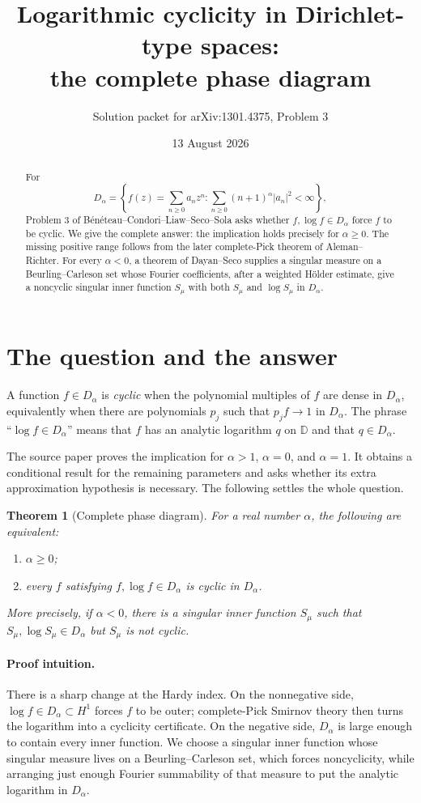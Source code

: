 \documentclass[11pt]{article}
\title{Logarithmic cyclicity in Dirichlet-type spaces:\\
the complete phase diagram}
\author{Solution packet for arXiv:1301.4375, Problem 3}
\date{13 August 2026}
\newtheorem{theorem}{Theorem}
\newcommand{\D}{\mathbb D}
\begin{document}
\maketitle

\begin{abstract}
For
\[
 D_\alpha=\left\{f(z)=\sum_{n\geq0}a_nz^n:
 \sum_{n\geq0}(n+1)^\alpha|a_n|^2<\infty\right\},
\]
Problem 3 of B\'en\'eteau--Condori--Liaw--Seco--Sola asks whether
$f,\log f\in D_\alpha$ force $f$ to be cyclic.  We give the complete
answer: the implication holds precisely for $\alpha\geq0$.  The missing
positive range follows from the later complete-Pick theorem of
Aleman--Richter.  For every $\alpha<0$, a theorem of Dayan--Seco supplies a
singular measure on a Beurling--Carleson set whose Fourier coefficients,
after a weighted H\"older estimate, give a noncyclic singular inner function
$S_\mu$ with both $S_\mu$ and $\log S_\mu$ in $D_\alpha$.
\end{abstract}

\section{The question and the answer}

A function $f\in D_\alpha$ is \emph{cyclic} when the polynomial multiples of
$f$ are dense in $D_\alpha$, equivalently when there are polynomials $p_j$
such that $p_jf\to1$ in $D_\alpha$.  The phrase ``$\log f\in D_\alpha$''
means that $f$ has an analytic logarithm $q$ on $\D$ and that
$q\in D_\alpha$.

The source paper \cite{BCLSS} proves the implication for $\alpha>1$,
$\alpha=0$, and $\alpha=1$.  It obtains a conditional result for the
remaining parameters and asks whether its extra approximation hypothesis is
necessary.  The following settles the whole question.

\begin{theorem}[Complete phase diagram]\label{thm:main}
For a real number $\alpha$, the following are equivalent:
\begin{enumerate}
\item $\alpha\geq0$;
\item every $f$ satisfying $f,\log f\in D_\alpha$ is cyclic in $D_\alpha$.
\end{enumerate}
More precisely, if $\alpha<0$, there is a singular inner function $S_\mu$
such that $S_\mu,\log S_\mu\in D_\alpha$ but $S_\mu$ is not cyclic.
\end{theorem}

\paragraph{Proof intuition.}
There is a sharp change at the Hardy index.  On the nonnegative side,
$\log f\in D_\alpha\subset H^1$ forces $f$ to be outer; complete-Pick
Smirnov theory then turns the logarithm into a cyclicity certificate.  On the
negative side, $D_\alpha$ is large enough to contain every inner function.
We choose a singular inner function whose singular measure lives on a
Beurling--Carleson set, which forces noncyclicity, while arranging just enough
Fourier summability of that measure to put the analytic logarithm in
$D_\alpha$.
\end{document}
